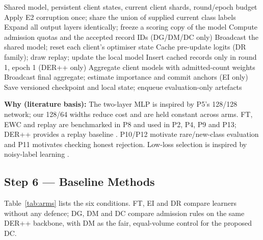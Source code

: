 \documentclass[10pt,a4paper]{article}
\newcommand{\why}[1]{\par\nopagebreak[4]\noindent\colorbox{black!5}{\parbox{\dimexpr\linewidth-2\fboxsep}{\small\textbf{Why (literature basis):} #1}}\par}
\begin{document}
\begin{algorithm}[H]
\caption{One supervised stage (experience)}
\label{alg:experience}
\begin{algorithmic}[1]
\Require Shared model, persistent client states, current client shards, round/epoch budget
\State Apply E2 corruption once; share the union of supplied current class labels
\State Expand all output layers identically; freeze a scoring copy of the model
\State Compute admission quotas and the accepted record IDs (DG/DM/DC only)
\State Broadcast the shared model; reset each client's optimiser state
\State Cache pre-update logits (DR family); draw replay; update the local model
\State Insert cached records only in round 1, epoch 1 (DER++ only)
\EndFor
\State Aggregate client models with admitted-count weights
\EndFor
\State Broadcast final aggregate; estimate importance and commit anchors (EI only)
\State Save versioned checkpoint and local state; enqueue evaluation-only artefacts
\end{algorithmic}
\end{algorithm}

\why{The two-layer MLP is inspired by P5's 128/128 network; our 128/64 widths reduce cost and are held constant across arms. FT, EWC and replay are benchmarked in P8 and used in P2, P4, P9 and P13; DER++ provides a replay baseline \cite{der}. P10/P12 motivate rare/new-class evaluation and P11 motivates checking honest rejection. Low-loss selection is inspired by noisy-label learning \cite{coteach,mentornet}.}

\subsection{Step 6 --- Baseline Methods}
Table~\ref{tab:arms} lists the six conditions. FT, EI and DR compare learners without any defence; DG, DM and DC compare admission rules on the same DER++ backbone, with DM as the fair, equal-volume control for the proposed DC.
\end{document}
